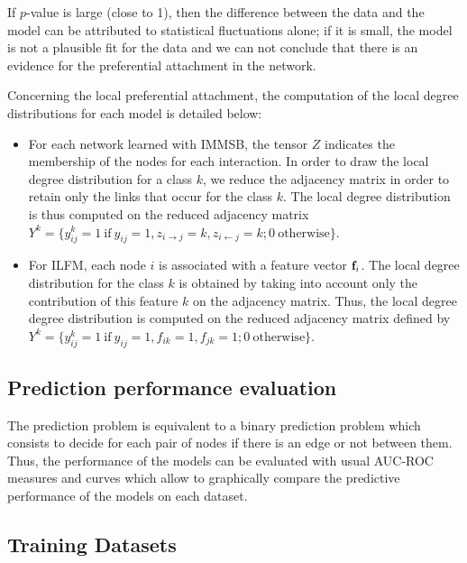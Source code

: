 If  $p$-value is large (close to 1), then the difference between the data and the model can be attributed to statistical fluctuations alone; if it is small, the model is not a plausible fit for the data and we can not conclude that there is an evidence for the preferential attachment in the network. 


Concerning the local preferential attachment, 
the computation of the local degree distributions for each model is detailed below: 
\begin{itemize}
    \item For each network learned with IMMSB, the tensor $Z$ indicates the membership of the nodes for each  interaction. In order to draw the local degree distribution for a class $k$, we reduce the adjacency matrix in order to retain only the links that occur for the class $k$. The local degree distribution is thus computed on the reduced adjacency matrix  $Y^k =\{ y_{ij}^k=1 \ \textrm{if}\ y_{ij}=1 , z_{i\rightarrow j}=k, z_{i\leftarrow j}=k; 0 \ \textrm{otherwise} \}$.
        \item For ILFM, each node $i$ is associated with a feature vector $\mathbf{f}_{i}$. The local degree distribution for the class $k$ is obtained by taking into account only the contribution of this feature $k$ on the adjacency matrix. Thus, the local degree degree distribution is computed on the reduced adjacency matrix defined by $Y^k =\{ y_{ij}^k=1 \ \textrm{if}\ y_{ij}=1 , f_{ik}=1, f_{jk}=1; 0 \ \textrm{otherwise}\}$.
\end{itemize}


\subsection{Prediction performance evaluation}
The prediction problem is equivalent to a binary prediction problem which consists to decide for each pair of nodes if there is an edge or not between them. 
Thus, the performance of the models can be evaluated with usual AUC-ROC measures and curves which allow to graphically compare the predictive performance of the models on each dataset.

\subsection{Training Datasets}

